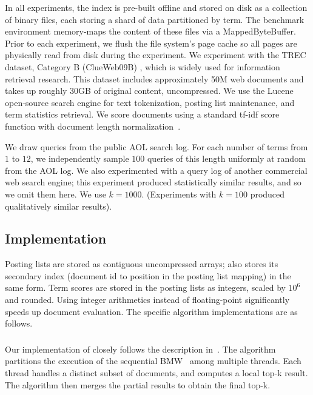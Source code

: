 In all experiments, the index is pre-built offline and stored on disk as a collection of binary files, 
each storing a shard of data partitioned by term.  The benchmark environment memory-maps the content 
of these files via a MappedByteBuffer.
Prior to each experiment, we flush the file system's page cache so all pages are physically read from disk during the experiment.
We  experiment with the TREC {\cw\/} dataset, 
Category B (ClueWeb09B) \cite{ClueWeb09}, which is widely used for information retrieval research. This dataset includes approximately 50M web documents and takes up roughly 30GB of original content, uncompressed.
We use the Lucene open-source search engine for text tokenization, posting list maintenance, 
and term statistics retrieval.
We score documents using 
a standard tf-idf score function with document length normalization~\cite{Baeza-Yates:1999:MIR:553876}. 

We draw queries from the public AOL search log.
For each number of terms from $1$ to $12$, we independently sample $100$ queries of this length uniformly at random from the AOL log.
We also  experimented with a query log of another commercial web search engine; this experiment  
produced statistically similar results, and so we omit them here.  
We use  $k=1000$. 
(Experiments with $k=100$ produced qualitatively similar results).

\subsection{Implementation}
\label{ssec:implementation}

Posting lists are stored as contiguous uncompressed arrays;  {\pRA} also stores 
its secondary index (document id to position in the posting list mapping) in the same form. 
Term scores are stored in the posting lists as integers, scaled by $10^6$ and rounded. 
Using integer arithmetics instead of floating-point significantly speeds up document evaluation. 
The specific algorithm implementations are as follows.

\subsubsection{\pBMW}
Our implementation of {\pBMW} closely follows the description in~\cite{rojas2013distributing}. The algorithm partitions the execution of the 
sequential BMW~\cite{Ding:2011} among multiple threads. Each thread handles a distinct subset of documents, and computes a local top-k 
result. The algorithm then merges the partial results to obtain the final top-k. 


